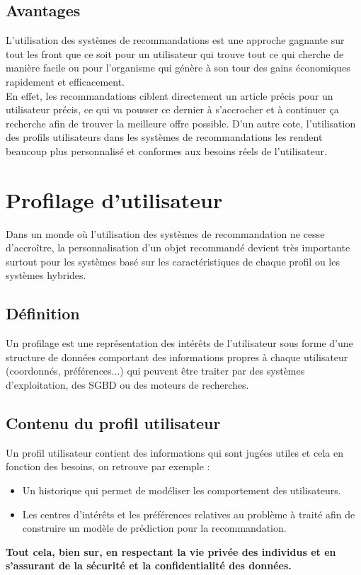 \subsection*{Avantages}
L'utilisation des systèmes de recommandations est une approche gagnante sur tout les front que ce soit pour un utilisateur qui trouve tout ce qui cherche de manière facile ou pour l'organisme qui génère à son tour des gains économiques rapidement et efficacement.\\
En effet, les recommandations ciblent directement un article précis pour un utilisateur précis, ce qui va pousser ce dernier à s'accrocher et à continuer ça recherche afin de trouver la meilleure offre possible. D'un autre cote, l'utilisation des profils utilisateurs dans les systèmes de recommandations les rendent beaucoup plus personnalisé et conformes aux besoins réels de l'utilisateur.\cite{figfiltering}

\section{Profilage d'utilisateur}
Dans un monde où l'utilisation des systèmes de recommandation ne cesse d’accroître, la personnalisation d'un objet recommandé devient très importante surtout pour les systèmes basé sur les caractéristiques de chaque profil ou les systèmes hybrides.

\subsection{Définition}
Un profilage est une représentation des intérêts de l'utilisateur sous forme d'une structure de données comportant des informations propres à chaque utilisateur (coordonnés, préférences...) qui peuvent être traiter par des systèmes d'exploitation, des SGBD ou des moteurs de recherches.

\subsection{Contenu du profil utilisateur}
Un profil utilisateur contient des informations qui sont jugées utiles et cela en fonction des besoins, on retrouve par exemple :\\
\begin{itemize}
    \item Un historique qui permet de modéliser les comportement des utilisateurs.
    \item Les centres d’intérêts et les préférences relatives au problème à traité afin de construire un modèle de prédiction pour la recommandation.
\end{itemize}
\textbf{Tout cela, bien sur, en respectant la vie privée des individus et en s'assurant de la sécurité et la confidentialité des données.}

